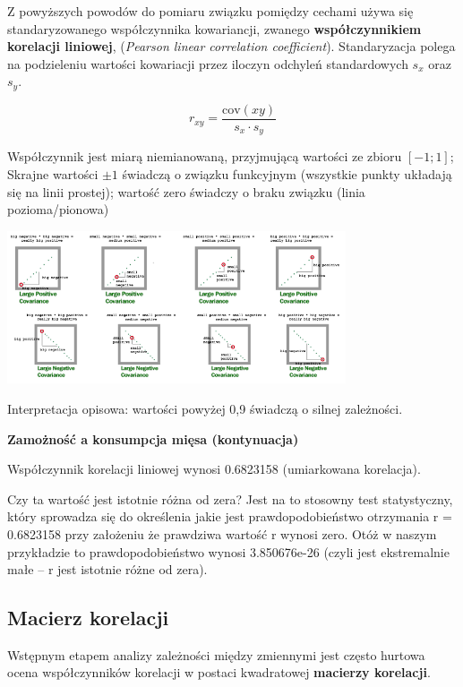 \documentclass[
  openany]{book}
\begin{document}
Z powyższych powodów do pomiaru związku pomiędzy cechami używa się
standaryzowanego współczynnika kowariancji,
zwanego \textbf{współczynnikiem korelacji liniowej}, (\emph{Pearson linear
correlation coefficient}). Standaryzacja polega na podzieleniu wartości
kowariacji przez iloczyn odchyleń standardowych \(s_x\) oraz \(s_y\).

\[r_{xy} = \frac{\mathrm{cov}(xy) }{s_x \cdot s_y}\]

Współczynnik jest miarą niemianowaną, przyjmującą wartości ze zbioru \([-1;1]\);
Skrajne wartości \(\pm 1\)
świadczą o związku funkcyjnym (wszystkie punkty układają się na linii prostej);
wartość zero świadczy o braku związku (linia pozioma/pionowa)

\includegraphics[width=0.75\textwidth,height=\textheight]{./covariance_explained.png}

Interpretacja opisowa: wartości powyżej 0,9 świadczą o silnej zależności.

\begin{example}
\textbf{Zamożność a konsumpcja mięsa (kontynuacja)}

Współczynnik korelacji liniowej wynosi 0.6823158 (umiarkowana korelacja).

Czy ta wartość jest istotnie różna od zera? Jest na to stosowny
test statystyczny, który sprowadza się do określenia jakie jest
prawdopodobieństwo otrzymania r = 0.6823158 przy założeniu że
prawdziwa wartość r wynosi zero. Otóż w naszym przykładzie
to prawdopodobieństwo wynosi 3.850676e-26
(czyli jest ekstremalnie małe -- r jest istotnie różne od zera).
\end{example}

\hypertarget{macierz-korelacji}{%
\subsection{Macierz korelacji}\label{macierz-korelacji}}

Wstępnym etapem analizy zależności między zmiennymi jest często
hurtowa ocena współczynników korelacji w postaci kwadratowej \textbf{macierzy korelacji}.
\end{document}
